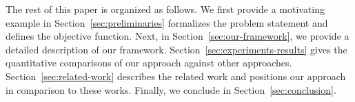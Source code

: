 The rest of this paper is organized as follows. We first provide a
motivating example in
Section~\ref{sec:preliminaries} formalizes the problem statement and
defines the objective function. Next, in
Section~\ref{sec:our-framework}, we provide a detailed description of
our framework. %
Section~\ref{sec:experiments-results} gives the quantitative
comparisons of our approach against other
approaches. Section~\ref{sec:related-work} describes the related work
and positions our approach in comparison to these works.  Finally, we
conclude in Section~\ref{sec:conclusion}.




